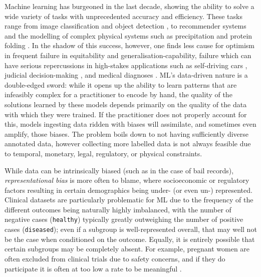 

Machine learning has burgeoned in the last decade, showing the ability to solve a wide variety of
tasks with unprecedented accuracy and efficiency.
%
These tasks range from image classification \citep{krizhevsky2012imagenet} and object detection
\citep{ren2015faster}, to recommender systems \citep{ying2018graph} and the modelling of complex
physical systems such as precipitation \citep{ravuri2021skillful} and protein folding
\citep{jumper2021highly}.
%
In the shadow of this success, however, one finds less cause for optimism in frequent failure in
equitability and generalisation-capability, failure which can have serious repercussions in
high-stakes applications such as self-driving cars \citep{sun2019unsupervised}, judicial
decision-making \citep{mayson2018bias}, and medical diagnoses \citep{albadawy2018deep}.
%
ML's data-driven nature is a double-edged sword: while it opens up the ability to learn patterns
that are infeasibly complex for a practitioner to encode by hand, the quality of the solutions
learned by these models depends primarily on the quality of the data with which they were trained.
%
If the practitioner does not properly account for this, models ingesting data ridden with biases
will assimilate, and sometimes even amplify, those biases.
%
The problem boils down to not having sufficiently diverse annotated data, however collecting more
labelled data is not always feasible due to temporal, monetary, legal, regulatory, or physical
constraints.

%
While data can be intrinsically biased (such as in the case of bail records),
\emph{representational bias} is more often to blame, where socioeconomic or regulatory factors
resulting in certain demographics being under- (or even un-) represented. 
%
Clinical datasets are particularly problematic for ML due to the frequency of the different
outcomes being naturally highly imbalanced, with the number of negative cases (\texttt{healthy})
typically greatly outweighing the number of positive cases (\texttt{diseased}); even if a subgroup
is well-represented overall, that may well not be the case when conditioned on the outcome.
%
Equally, it is entirely possible that certain subgroups may be completely absent. 
%
For example, pregnant women are often excluded from clinical trials due to safety concerns, and if
they do participate it is often at too low a rate to be meaningful \citep{afrose2021overcoming}.


